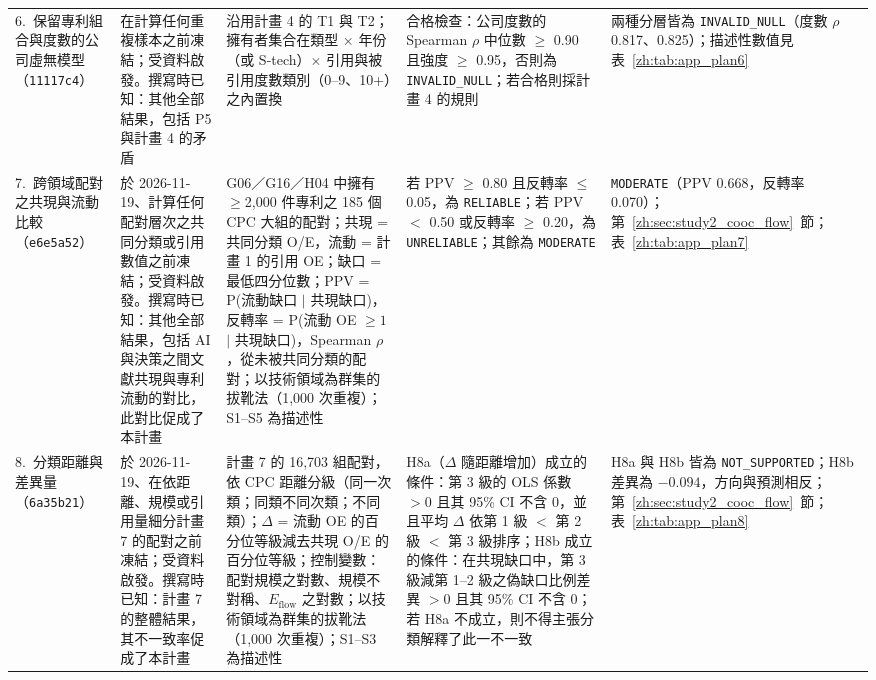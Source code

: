 \begin{table}[tbp]
\begin{tabular}{p{2.0cm}p{2.5cm}p{3.7cm}p{4.3cm}p{2.3cm}}
\addlinespace
\raggedright 6.~保留專利組合與度數的公司虛無模型（\texttt{11117c4}） &
\raggedright 在計算任何重複樣本之前凍結；受資料啟發。撰寫時已知：其他全部結果，包括 P5 與計畫 4 的矛盾 &
\raggedright 沿用計畫 4 的 T1 與 T2；擁有者集合在類型 $\times$ 年份（或 S-tech）$\times$ 引用與被引用度數類別（0--9、10+）之內置換 &
\raggedright 合格檢查：公司度數的 Spearman $\rho$ 中位數 $\geq$ 0.90 且強度 $\geq$ 0.95，否則為 \texttt{INVALID\_\allowbreak NULL}；若合格則採計畫 4 的規則 &
\raggedright 兩種分層皆為 \texttt{INVALID\_\allowbreak NULL}（度數 $\rho$ 0.817、0.825）；描述性數值見表~\ref{zh:tab:app_plan6} \tabularnewline
\addlinespace
\raggedright 7.~跨領域配對之共現與流動比較（\texttt{e6e5a52}） &
\raggedright 於 2026-11-19、計算任何配對層次之共同分類或引用數值之前凍結；受資料啟發。撰寫時已知：其他全部結果，包括 AI 與決策之間文獻共現與專利流動的對比，此對比促成了本計畫 &
\raggedright G06／G16／H04 中擁有 $\geq$2,000 件專利之 185 個 CPC 大組的配對；共現 = 共同分類 O/E，流動 = 計畫 1 的引用 OE；缺口 = 最低四分位數；PPV = P(流動缺口 $\mid$ 共現缺口)，反轉率 = P(流動 OE $\geq 1$ $\mid$ 共現缺口)，Spearman $\rho$，從未被共同分類的配對；以技術領域為群集的拔靴法（1,000 次重複）；S1--S5 為描述性 &
\raggedright 若 PPV $\geq$ 0.80 且反轉率 $\leq$ 0.05，為 \texttt{RELIABLE}；若 PPV $<$ 0.50 或反轉率 $\geq$ 0.20，為 \texttt{UNRELIABLE}；其餘為 \texttt{MODERATE} &
\raggedright \texttt{MODERATE}（PPV 0.668，反轉率 0.070）；第~\ref{zh:sec:study2_cooc_flow}~節；表~\ref{zh:tab:app_plan7} \tabularnewline
\addlinespace
\raggedright 8.~分類距離與差異量（\texttt{6a35b21}） &
\raggedright 於 2026-11-19、在依距離、規模或引用量細分計畫 7 的配對之前凍結；受資料啟發。撰寫時已知：計畫 7 的整體結果，其不一致率促成了本計畫 &
\raggedright 計畫 7 的 16,703 組配對，依 CPC 距離分級（同一次類；同類不同次類；不同類）；$\Delta$ = 流動 OE 的百分位等級減去共現 O/E 的百分位等級；控制變數：配對規模之對數、規模不對稱、$E_{\mathrm{flow}}$ 之對數；以技術領域為群集的拔靴法（1,000 次重複）；S1--S3 為描述性 &
\raggedright H8a（$\Delta$ 隨距離增加）成立的條件：第 3 級的 OLS 係數 $>0$ 且其 95\% CI 不含 0，並且平均 $\Delta$ 依第 1 級 $<$ 第 2 級 $<$ 第 3 級排序；H8b 成立的條件：在共現缺口中，第 3 級減第 1--2 級之偽缺口比例差異 $>0$ 且其 95\% CI 不含 0；若 H8a 不成立，則不得主張分類解釋了此一不一致 &
\raggedright H8a 與 H8b 皆為 \texttt{NOT\_\allowbreak SUPPORTED}；H8b 差異為 $-0.094$，方向與預測相反；第~\ref{zh:sec:study2_cooc_flow}~節；表~\ref{zh:tab:app_plan8} \tabularnewline
\bottomrule
\end{tabular}
\end{table}

